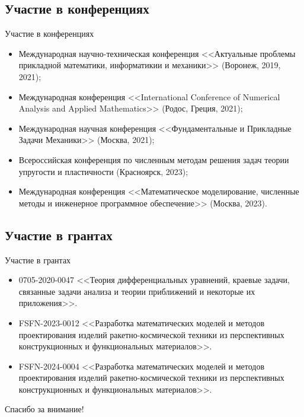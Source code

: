 \subsection{Участие в конференциях}
\begin{frame}{Участие в конференциях}
    \begin{itemize}
    \justifying
        \item Международная научно-техническая конференция <<Актуальные проблемы прикладной математики, информатикии и механики>> (Воронеж, 2019, 2021);
        \item Международная конференция <<International Conference of Nume\-rical Analysis and Applied Mathematics>> (Родос, Греция, 2021);
        \item Международная научная конференция <<Фундаментальные и Прикладные Задачи Механики>> (Москва, 2021);
        \item Всероссийская конференция по численным методам решения задач теории упругости и пластичности (Красноярск, 2023);
        \item Международная конференция <<Математическое моделирование, численные методы и инженерное программное обеспечение>> (Москва, 2023).
    \end{itemize}
\end{frame}

\subsection{Участие в грантах}
\begin{frame}{Участие в грантах}
    \begin{itemize}
    \justifying
        \item 0705-2020-0047 <<Теория дифференциальных уравнений, краевые задачи, связанные задачи анализа и теории приближений и некоторые их приложения>>.
	\item FSFN-2023-0012 <<Разработка математических моделей и методов проектирования изделий ракетно-космической техники из перспективных конструкционных и функциональных материалов>>.
	\item FSFN-2024-0004 <<Разработка математических моделей и методов проектирования изделий ракетно-космической техники из перспективных конструкционных и функциональных материалов>>.
    \end{itemize}
\end{frame}

\begin{frame} %
    \begin{center}
        \Huge
        Спасибо за внимание!
    \end{center}
\end{frame}
